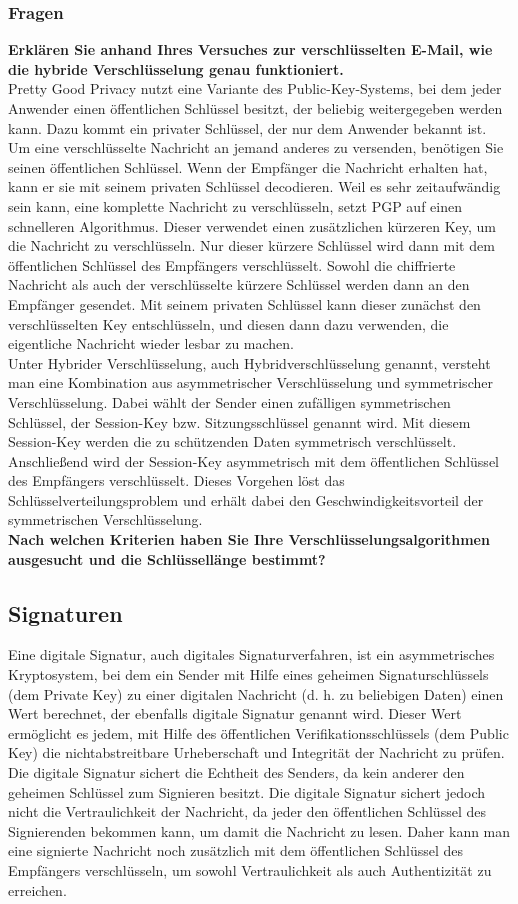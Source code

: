 \documentclass[12pt,a4paper]{article}
\begin{document}
\subsubsection{Fragen}
\textbf{Erklären Sie anhand Ihres Versuches zur verschlüsselten E-Mail, wie die hybride Verschlüsselung genau funktioniert.}\\
Pretty Good Privacy nutzt eine Variante des Public-Key-Systems, bei dem jeder Anwender einen öffentlichen Schlüssel besitzt, der beliebig weitergegeben werden kann. Dazu kommt ein privater Schlüssel, der nur dem Anwender bekannt ist. Um eine verschlüsselte Nachricht an jemand anderes zu versenden, benötigen Sie seinen öffentlichen Schlüssel. Wenn der Empfänger die Nachricht erhalten hat, kann er sie mit seinem privaten Schlüssel decodieren. Weil es sehr zeitaufwändig sein kann, eine komplette Nachricht zu verschlüsseln, setzt PGP auf einen schnelleren Algorithmus. Dieser verwendet einen zusätzlichen kürzeren Key, um die Nachricht zu verschlüsseln. Nur dieser kürzere Schlüssel wird dann mit dem öffentlichen Schlüssel des Empfängers verschlüsselt. Sowohl die chiffrierte Nachricht als auch der verschlüsselte kürzere Schlüssel werden dann an den Empfänger gesendet. Mit seinem privaten Schlüssel kann dieser zunächst den verschlüsselten Key entschlüsseln, und diesen dann dazu verwenden, die eigentliche Nachricht wieder lesbar zu machen.\\
Unter Hybrider Verschlüsselung, auch Hybridverschlüsselung genannt, versteht man eine Kombination aus asymmetrischer Verschlüsselung und symmetrischer Verschlüsselung. Dabei wählt der Sender einen zufälligen symmetrischen Schlüssel, der Session-Key bzw. Sitzungsschlüssel genannt wird. Mit diesem Session-Key werden die zu schützenden Daten symmetrisch verschlüsselt. Anschließend wird der Session-Key asymmetrisch mit dem öffentlichen Schlüssel des Empfängers verschlüsselt. Dieses Vorgehen löst das Schlüsselverteilungsproblem und erhält dabei den Geschwindigkeitsvorteil der symmetrischen Verschlüsselung.\\
\textbf{Nach welchen Kriterien haben Sie Ihre Verschlüsselungsalgorithmen ausgesucht und die Schlüssellänge bestimmt?}
\bigskip
\subsection{Signaturen}
Eine digitale Signatur, auch digitales Signaturverfahren, ist ein asymmetrisches Kryptosystem, 
	  bei dem ein Sender mit Hilfe eines geheimen Signaturschlüssels (dem Private Key) zu einer digitalen Nachricht 
	  (d. h. zu beliebigen Daten) einen Wert berechnet, der ebenfalls digitale Signatur genannt wird. Dieser Wert 
	  ermöglicht es jedem, mit Hilfe des öffentlichen Verifikationsschlüssels (dem Public Key) die nichtabstreitbare Urheberschaft und Integrität der Nachricht zu prüfen.
	   Die digitale Signatur sichert die Echtheit des Senders, da kein anderer den geheimen Schlüssel zum Signieren besitzt. Die digitale Signatur sichert jedoch nicht die Vertraulichkeit der Nachricht, da jeder den öffentlichen Schlüssel des Signierenden bekommen kann, um damit die Nachricht zu lesen. Daher kann man eine signierte Nachricht noch zusätzlich mit dem öffentlichen Schlüssel des Empfängers verschlüsseln, um sowohl Vertraulichkeit als auch Authentizität zu erreichen.
\end{document}

